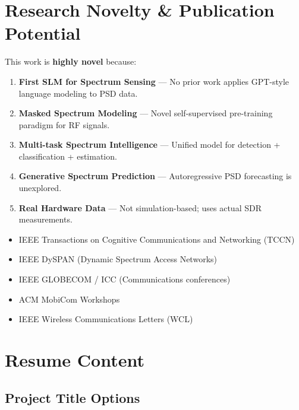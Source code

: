 \documentclass[12pt, a4paper]{article}
\begin{document}
\section{Research Novelty \& Publication Potential}

This work is \textbf{highly novel} because:

\begin{enumerate}[leftmargin=1.5em]
    \item \textbf{First SLM for Spectrum Sensing} — No prior work applies GPT-style language modeling to PSD data.
    \item \textbf{Masked Spectrum Modeling} — Novel self-supervised pre-training paradigm for RF signals.
    \item \textbf{Multi-task Spectrum Intelligence} — Unified model for detection + classification + estimation.
    \item \textbf{Generative Spectrum Prediction} — Autoregressive PSD forecasting is unexplored.
    \item \textbf{Real Hardware Data} — Not simulation-based; uses actual SDR measurements.
\end{enumerate}

\begin{tipbox}
\begin{itemize}[leftmargin=1.5em]
    \item IEEE Transactions on Cognitive Communications and Networking (TCCN)
    \item IEEE DySPAN (Dynamic Spectrum Access Networks)
    \item IEEE GLOBECOM / ICC (Communications conferences)
    \item ACM MobiCom Workshops
    \item IEEE Wireless Communications Letters (WCL)
\end{itemize}
\end{tipbox}


\section{Resume Content}

\subsection{Project Title Options}
\end{document}
